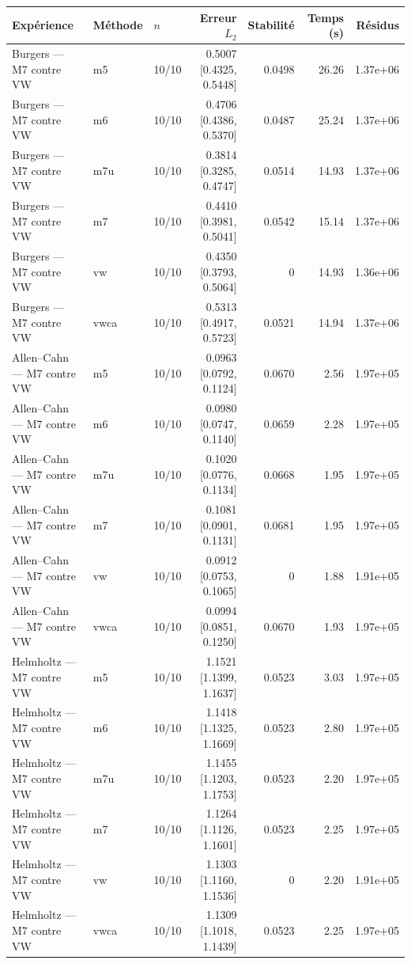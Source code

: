 \begin{tabular}{lllrrrr}
\toprule
Expérience & Méthode & $n$ & Erreur $L_2$ & Stabilité & Temps (s) & Résidus \\
\midrule
Burgers — M7 contre VW & m5 & 10/10 & 0.5007 [0.4325, 0.5448] & 0.0498 & 26.26 & 1.37e+06 \\
Burgers — M7 contre VW & m6 & 10/10 & 0.4706 [0.4386, 0.5370] & 0.0487 & 25.24 & 1.37e+06 \\
Burgers — M7 contre VW & m7u & 10/10 & 0.3814 [0.3285, 0.4747] & 0.0514 & 14.93 & 1.37e+06 \\
Burgers — M7 contre VW & m7 & 10/10 & 0.4410 [0.3981, 0.5041] & 0.0542 & 15.14 & 1.37e+06 \\
Burgers — M7 contre VW & vw & 10/10 & 0.4350 [0.3793, 0.5064] & 0 & 14.93 & 1.36e+06 \\
Burgers — M7 contre VW & vwca & 10/10 & 0.5313 [0.4917, 0.5723] & 0.0521 & 14.94 & 1.37e+06 \\
Allen–Cahn — M7 contre VW & m5 & 10/10 & 0.0963 [0.0792, 0.1124] & 0.0670 & 2.56 & 1.97e+05 \\
Allen–Cahn — M7 contre VW & m6 & 10/10 & 0.0980 [0.0747, 0.1140] & 0.0659 & 2.28 & 1.97e+05 \\
Allen–Cahn — M7 contre VW & m7u & 10/10 & 0.1020 [0.0776, 0.1134] & 0.0668 & 1.95 & 1.97e+05 \\
Allen–Cahn — M7 contre VW & m7 & 10/10 & 0.1081 [0.0901, 0.1131] & 0.0681 & 1.95 & 1.97e+05 \\
Allen–Cahn — M7 contre VW & vw & 10/10 & 0.0912 [0.0753, 0.1065] & 0 & 1.88 & 1.91e+05 \\
Allen–Cahn — M7 contre VW & vwca & 10/10 & 0.0994 [0.0851, 0.1250] & 0.0670 & 1.93 & 1.97e+05 \\
Helmholtz — M7 contre VW & m5 & 10/10 & 1.1521 [1.1399, 1.1637] & 0.0523 & 3.03 & 1.97e+05 \\
Helmholtz — M7 contre VW & m6 & 10/10 & 1.1418 [1.1325, 1.1669] & 0.0523 & 2.80 & 1.97e+05 \\
Helmholtz — M7 contre VW & m7u & 10/10 & 1.1455 [1.1203, 1.1753] & 0.0523 & 2.20 & 1.97e+05 \\
Helmholtz — M7 contre VW & m7 & 10/10 & 1.1264 [1.1126, 1.1601] & 0.0523 & 2.25 & 1.97e+05 \\
Helmholtz — M7 contre VW & vw & 10/10 & 1.1303 [1.1160, 1.1536] & 0 & 2.20 & 1.91e+05 \\
Helmholtz — M7 contre VW & vwca & 10/10 & 1.1309 [1.1018, 1.1439] & 0.0523 & 2.25 & 1.97e+05 \\

\end{tabular}
